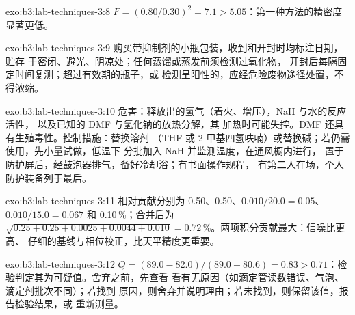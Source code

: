 \begin{solution}{exo:b3:lab-techniques-3:8}
$F = (0.80/0.30)^2 = 7.1 > 5.05$：第一种方法的精密度显著更低。
\end{solution}

\begin{solution}{exo:b3:lab-techniques-3:9}
购买带抑制剂的小瓶包装，收到和开封时均标注日期，贮存
于密闭、避光、阴凉处；任何蒸馏或蒸发前须检测过氧化物，
开封后每隔固定时间复测；超过有效期的瓶子，或
检测呈阳性的，应经危险废物途径处置，不得浓缩。
\end{solution}

\begin{solution}{exo:b3:lab-techniques-3:10}
危害：释放出的氢气（着火、增压），NaH 与水的反应活性，
以及已知的 DMF 与氢化钠的放热分解，其
加热时可能失控。DMF 还具有生殖毒性。控制措施：替换溶剂
（THF 或 2-甲基四氢呋喃）或替换碱；若仍需使用，先小量试做，低温下
分批加入 NaH 并监测温度，在通风橱内进行，
置于防护屏后，经鼓泡器排气，备好冷却浴；有书面操作规程，
有第二人在场，个人防护装备列于最后。
\end{solution}

\begin{solution}{exo:b3:lab-techniques-3:11}
相对贡献分别为 0.50、0.50、$0.010/20.0 = 0.05$、$0.010/15.0 = 0.067$ 和 0.10\,\%；合并后为
$\sqrt{0.25 + 0.25 + 0.0025 + 0.0044 + 0.010} = 0.72$\,\%。两项积分贡献最大：信噪比更高、
仔细的基线与相位校正，比天平精度更重要。
\end{solution}

\begin{solution}{exo:b3:lab-techniques-3:12}
$Q = (89.0 - 82.0)/(89.0 - 80.6) = 0.83 > 0.71$：检验判定其为可疑值。舍弃之前，先查看
看有无原因（如滴定管读数错误、气泡、滴定剂批次不同）；若找到
原因，则舍弃并说明理由；若未找到，则保留该值，报告检验结果，或
重新测量。
\end{solution}

